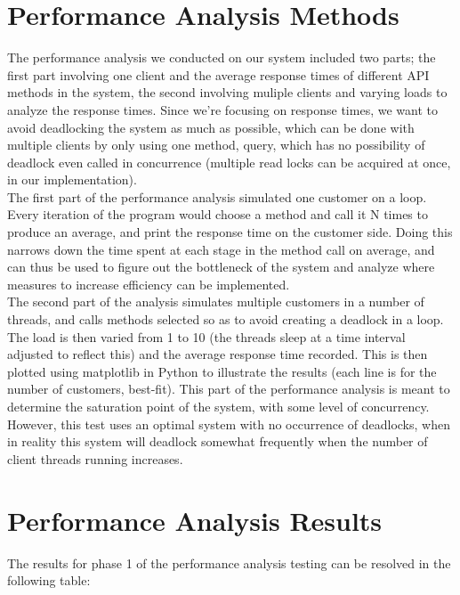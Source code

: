 \documentclass[letterpaper,12pt]{article}
\begin{document}
	\section{Performance Analysis Methods}
	
	The performance analysis we conducted on our system included two parts; the first part involving one client and the average response times of different API methods in the system, the second involving muliple clients and varying loads to analyze the response times. Since we're focusing on response times, we want to avoid deadlocking the system as much as possible, which can be done with multiple clients by only using one method, query, which has no possibility of deadlock even called in concurrence (multiple read locks can be acquired at once, in our implementation). \\
	
	The first part of the performance analysis simulated one customer on a loop. Every iteration of the program would choose a method and call it N times to produce an average, and print the response time on the customer side. Doing this narrows down the time spent at each stage in the method call on average, and can thus be used to figure out the bottleneck of the system and analyze where measures to increase efficiency can be implemented.\\
	
	The second part of the analysis simulates multiple customers in a number of threads, and calls methods selected so as to avoid creating a deadlock in a loop. The load is then varied from 1 to 10 (the threads sleep at a time interval adjusted to reflect this) and the average response time recorded. This is then plotted using matplotlib in Python to illustrate the results (each line is for the number of customers, best-fit). This part of the performance analysis is meant to determine the saturation point of the system, with some level of concurrency. However, this test uses an optimal system with no occurrence of deadlocks, when in reality this system will deadlock somewhat frequently when the number of client threads running increases. 
	
	\section{ Performance Analysis Results}
	The results for phase 1 of the performance analysis testing can be resolved in the following table:
	
\end{document}
